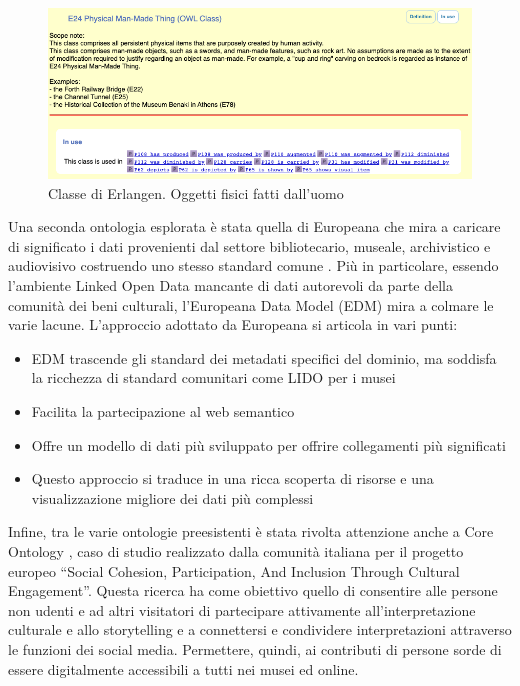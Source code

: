 \documentclass[12pt]{article}
\begin{document}
\begin{figure}[!hb]
   \centering
   \includegraphics[scale=0.5]{fig/classe di CIDOC.png}
   \caption{Classe di Erlangen. Oggetti fisici fatti dall'uomo}\label{fig:picture}
\end{figure}

Una seconda ontologia esplorata è stata quella di Europeana che mira a caricare di significato i dati provenienti dal settore bibliotecario, museale, archivistico e audiovisivo costruendo uno stesso standard comune \parencite{europeana}. Più in particolare, essendo l’ambiente Linked Open Data mancante di dati autorevoli da parte della comunità dei beni culturali, l’Europeana Data Model (EDM) mira a colmare le varie lacune. 
\newpage
L’approccio adottato da Europeana si articola in vari punti:

\begin{itemize}
 \item EDM trascende gli standard dei metadati specifici del dominio, ma soddisfa la ricchezza di standard comunitari come LIDO per i musei 
 \item Facilita la partecipazione al web semantico
 \item Offre un modello di dati più sviluppato per offrire collegamenti più significati
 \item Questo approccio si traduce in una ricca scoperta di risorse e una visualizzazione migliore dei dati più complessi
\end{itemize} 
 
Infine, tra le varie ontologie preesistenti è stata rivolta attenzione anche a Core Ontology \parencite{core}, caso di studio realizzato dalla comunità italiana per il progetto europeo “Social Cohesion, Participation, And Inclusion Through Cultural Engagement”. Questa ricerca ha come obiettivo quello di consentire alle persone non udenti e ad altri visitatori di partecipare attivamente all’interpretazione culturale e allo storytelling e a connettersi e condividere interpretazioni attraverso le funzioni dei social media. Permettere, quindi, ai contributi di persone sorde di essere digitalmente accessibili a tutti nei musei ed online.
\end{document}
